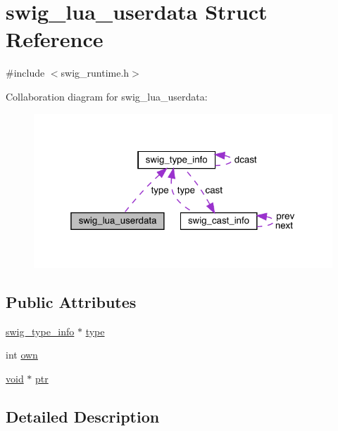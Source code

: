 \hypertarget{structswig__lua__userdata}{}\section{swig\+\_\+lua\+\_\+userdata Struct Reference}
\label{structswig__lua__userdata}


{\ttfamily \#include $<$swig\+\_\+runtime.\+h$>$}



Collaboration diagram for swig\+\_\+lua\+\_\+userdata\+:\nopagebreak
\begin{figure}[H]
\begin{center}
\leavevmode
\includegraphics[width=319pt]{structswig__lua__userdata__coll__graph}
\end{center}
\end{figure}
\subsection*{Public Attributes}
\begin{DoxyCompactItemize}
\item 
\mbox{\hyperlink{structswig__type__info}{swig\+\_\+type\+\_\+info}} $\ast$ \mbox{\hyperlink{structswig__lua__userdata_aed83344d96f9da7bf57f9bb604cb1d53}{type}}
\item 
int \mbox{\hyperlink{structswig__lua__userdata_a12970d19b437f84b1e7fba18ede882cb}{own}}
\item 
\mbox{\hyperlink{_thread_8h_af1e856da2e658414cb2456cb6f7ebc66}{void}} $\ast$ \mbox{\hyperlink{structswig__lua__userdata_a2d3be052ee0b81986ab31ef5dc08fd25}{ptr}}
\end{DoxyCompactItemize}


\subsection{Detailed Description}


